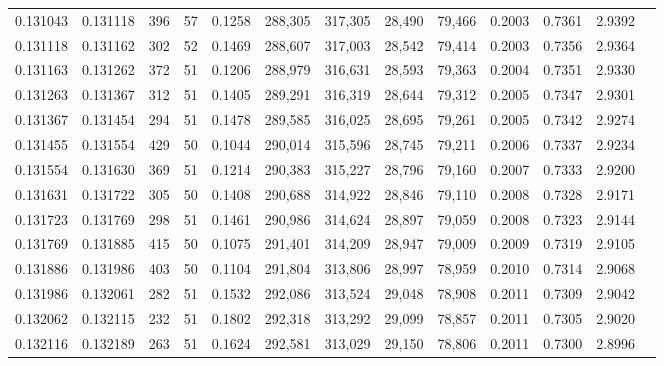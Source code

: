 \begin{tabular}{rrrrrrrrrrrrr}
0.131043 & 0.131118 &   396 &  57 &                                     0.1258 & 288,305 & 317,305 &  28,490 &  79,466 & 0.2003 & 0.7361 & 2.9392 \\
0.131118 & 0.131162 &   302 &  52 &                                     0.1469 & 288,607 & 317,003 &  28,542 &  79,414 & 0.2003 & 0.7356 & 2.9364 \\
0.131163 & 0.131262 &   372 &  51 &                                     0.1206 & 288,979 & 316,631 &  28,593 &  79,363 & 0.2004 & 0.7351 & 2.9330 \\
0.131263 & 0.131367 &   312 &  51 &                                     0.1405 & 289,291 & 316,319 &  28,644 &  79,312 & 0.2005 & 0.7347 & 2.9301 \\
0.131367 & 0.131454 &   294 &  51 &                                     0.1478 & 289,585 & 316,025 &  28,695 &  79,261 & 0.2005 & 0.7342 & 2.9274 \\
0.131455 & 0.131554 &   429 &  50 &                                     0.1044 & 290,014 & 315,596 &  28,745 &  79,211 & 0.2006 & 0.7337 & 2.9234 \\
0.131554 & 0.131630 &   369 &  51 &                                     0.1214 & 290,383 & 315,227 &  28,796 &  79,160 & 0.2007 & 0.7333 & 2.9200 \\
0.131631 & 0.131722 &   305 &  50 &                                     0.1408 & 290,688 & 314,922 &  28,846 &  79,110 & 0.2008 & 0.7328 & 2.9171 \\
0.131723 & 0.131769 &   298 &  51 &                                     0.1461 & 290,986 & 314,624 &  28,897 &  79,059 & 0.2008 & 0.7323 & 2.9144 \\
0.131769 & 0.131885 &   415 &  50 &                                     0.1075 & 291,401 & 314,209 &  28,947 &  79,009 & 0.2009 & 0.7319 & 2.9105 \\
0.131886 & 0.131986 &   403 &  50 &                                     0.1104 & 291,804 & 313,806 &  28,997 &  78,959 & 0.2010 & 0.7314 & 2.9068 \\
0.131986 & 0.132061 &   282 &  51 &                                     0.1532 & 292,086 & 313,524 &  29,048 &  78,908 & 0.2011 & 0.7309 & 2.9042 \\
0.132062 & 0.132115 &   232 &  51 &                                     0.1802 & 292,318 & 313,292 &  29,099 &  78,857 & 0.2011 & 0.7305 & 2.9020 \\
0.132116 & 0.132189 &   263 &  51 &                                     0.1624 & 292,581 & 313,029 &  29,150 &  78,806 & 0.2011 & 0.7300 & 2.8996 \\

\end{tabular}

